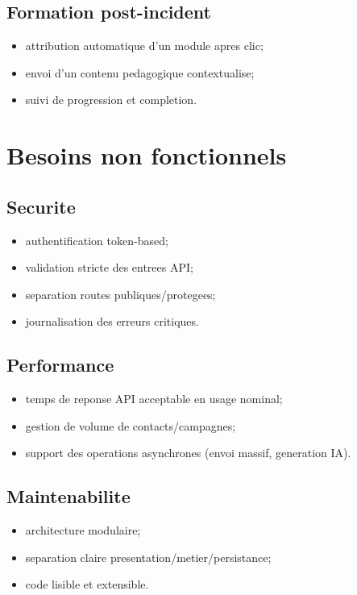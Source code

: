\documentclass[12pt,a4paper,oneside]{report}
\begin{document}
\subsection{Formation post-incident}
\begin{itemize}[leftmargin=1.2cm]
  \item attribution automatique d'un module apres clic;
  \item envoi d'un contenu pedagogique contextualise;
  \item suivi de progression et completion.
\end{itemize}

\section{Besoins non fonctionnels}
\subsection{Securite}
\begin{itemize}[leftmargin=1.2cm]
  \item authentification token-based;
  \item validation stricte des entrees API;
  \item separation routes publiques/protegees;
  \item journalisation des erreurs critiques.
\end{itemize}

\subsection{Performance}
\begin{itemize}[leftmargin=1.2cm]
  \item temps de reponse API acceptable en usage nominal;
  \item gestion de volume de contacts/campagnes;
  \item support des operations asynchrones (envoi massif, generation IA).
\end{itemize}

\subsection{Maintenabilite}
\begin{itemize}[leftmargin=1.2cm]
  \item architecture modulaire;
  \item separation claire presentation/metier/persistance;
  \item code lisible et extensible.
\end{itemize}
\end{document}
